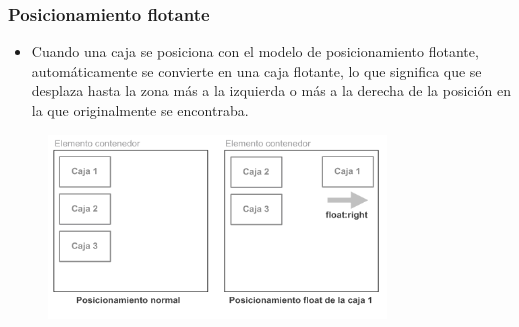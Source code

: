 \documentclass[ucs]{beamer}
\begin{document}

\begin{frame}
\frametitle{Posicionamiento flotante}

\begin{itemize}
  \item Cuando una caja se posiciona con el modelo de posicionamiento flotante, automáticamente se convierte en una caja flotante, lo que significa que se desplaza hasta la zona más a la izquierda o más a la derecha de la posición en la que originalmente se encontraba.
\end{itemize}


\begin{center}
\begin{figure}[p]
\includegraphics[width=0.8\textwidth]{figs/f0507.png}
\end{figure}
\end{center}

\end{frame}


\end{document}
